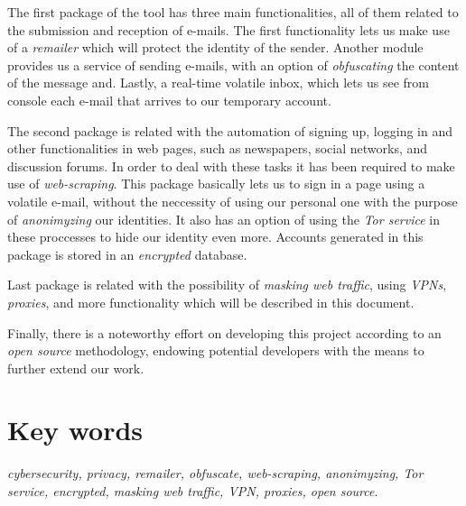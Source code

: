 The first package of the tool has three main functionalities, all of
them related to the submission and reception of e-mails. The first
functionality lets us make use of a \textit{remailer} which will
protect the identity of the sender. Another module provides us a
service of sending e-mails, with an option of \textit{obfuscating} the
content of the message and. Lastly, a real-time volatile inbox, which
lets us see from console each e-mail that arrives to our temporary
account.

The second package is related with the automation of signing up,
logging in and other functionalities in web pages, such as newspapers,
social networks, and discussion forums. In order to deal with these
tasks it has been required to make use of \textit{web-scraping}. This
package basically lets us to sign in a page using a volatile e-mail,
without the neccessity of using our personal one with the purpose of
\textit{anonimyzing} our identities. It also has an option of using
the \textit{Tor service} in these proccesses to hide our identity even
more. Accounts generated in this package is stored in an
\textit{encrypted} database.

Last package is related with the possibility of \textit{masking web
  traffic}, using \textit{VPNs}, \textit{proxies}, and more
functionality which will be described in this document.

Finally, there is a noteworthy effort {on} developing this
project {according to an \textit{open source} methodology},
{endowing potential developers with the means to further
  extend our work.}


\section*{Key words}
\textit{cybersecurity, privacy, remailer, obfuscate, web-scraping, anonimyzing, Tor service, encrypted, masking web traffic, VPN, proxies, open source}.

